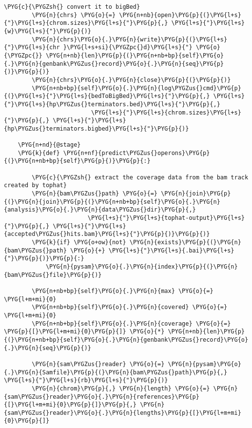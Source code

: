 \begin{Verbatim}[commandchars=\\\{\}]
        \PYG{c}{\PYGZsh{} convert it to bigBed}
        \PYG{n}{chrs} \PYG{o}{=} \PYG{n+nb}{open}\PYG{p}{(}\PYG{l+s}{"}\PYG{l+s}{chrom.sizes}\PYG{l+s}{"}\PYG{p}{,} \PYG{l+s}{"}\PYG{l+s}{w}\PYG{l+s}{"}\PYG{p}{)}
        \PYG{n}{chrs}\PYG{o}{.}\PYG{n}{write}\PYG{p}{(}\PYG{l+s}{"}\PYG{l+s}{chr }\PYG{l+s+si}{\PYGZpc{}d}\PYG{l+s}{"} \PYG{o}{\PYGZpc{}} \PYG{n+nb}{len}\PYG{p}{(}\PYG{n+nb+bp}{self}\PYG{o}{.}\PYG{n}{genbank\PYGZus{}record}\PYG{o}{.}\PYG{n}{seq}\PYG{p}{)}\PYG{p}{)}
        \PYG{n}{chrs}\PYG{o}{.}\PYG{n}{close}\PYG{p}{(}\PYG{p}{)}
        \PYG{n+nb+bp}{self}\PYG{o}{.}\PYG{n}{log\PYGZus{}cmd}\PYG{p}{(}\PYG{l+s}{"}\PYG{l+s}{bedToBigBed}\PYG{l+s}{"}\PYG{p}{,} \PYG{l+s}{"}\PYG{l+s}{hp\PYGZus{}terminators.bed}\PYG{l+s}{"}\PYG{p}{,}
                         \PYG{l+s}{"}\PYG{l+s}{chrom.sizes}\PYG{l+s}{"}\PYG{p}{,} \PYG{l+s}{"}\PYG{l+s}{hp\PYGZus{}terminators.bigbed}\PYG{l+s}{"}\PYG{p}{)}

    \PYG{n+nd}{@stage}
    \PYG{k}{def} \PYG{n+nf}{predict\PYGZus{}operons}\PYG{p}{(}\PYG{n+nb+bp}{self}\PYG{p}{)}\PYG{p}{:}

        \PYG{c}{\PYGZsh{} extract the coverage data from the bam track created by tophat}
        \PYG{n}{bam\PYGZus{}path} \PYG{o}{=} \PYG{n}{join}\PYG{p}{(}\PYG{n}{join}\PYG{p}{(}\PYG{n+nb+bp}{self}\PYG{o}{.}\PYG{n}{analysis}\PYG{o}{.}\PYG{n}{data\PYGZus{}dir}\PYG{p}{,}
                        \PYG{l+s}{"}\PYG{l+s}{tophat-output}\PYG{l+s}{"}\PYG{p}{,} \PYG{l+s}{"}\PYG{l+s}{accepted\PYGZus{}hits.bam}\PYG{l+s}{"}\PYG{p}{)}\PYG{p}{)}
        \PYG{k}{if} \PYG{o+ow}{not} \PYG{n}{exists}\PYG{p}{(}\PYG{n}{bam\PYGZus{}path} \PYG{o}{+} \PYG{l+s}{"}\PYG{l+s}{.bai}\PYG{l+s}{"}\PYG{p}{)}\PYG{p}{:}
            \PYG{n}{pysam}\PYG{o}{.}\PYG{n}{index}\PYG{p}{(}\PYG{n}{bam\PYGZus{}file}\PYG{p}{)}

        \PYG{n+nb+bp}{self}\PYG{o}{.}\PYG{n}{max} \PYG{o}{=} \PYG{l+m+mi}{0}
        \PYG{n+nb+bp}{self}\PYG{o}{.}\PYG{n}{covered} \PYG{o}{=} \PYG{l+m+mi}{0}
        \PYG{n+nb+bp}{self}\PYG{o}{.}\PYG{n}{coverage} \PYG{o}{=} \PYG{p}{[}\PYG{l+m+mi}{0}\PYG{p}{]} \PYG{o}{*} \PYG{n+nb}{len}\PYG{p}{(}\PYG{n+nb+bp}{self}\PYG{o}{.}\PYG{n}{genbank\PYGZus{}record}\PYG{o}{.}\PYG{n}{seq}\PYG{p}{)}

        \PYG{n}{sam\PYGZus{}reader} \PYG{o}{=} \PYG{n}{pysam}\PYG{o}{.}\PYG{n}{Samfile}\PYG{p}{(}\PYG{n}{bam\PYGZus{}path}\PYG{p}{,} \PYG{l+s}{"}\PYG{l+s}{rb}\PYG{l+s}{"}\PYG{p}{)}
        \PYG{n}{chrom}\PYG{p}{,} \PYG{n}{length} \PYG{o}{=} \PYG{n}{sam\PYGZus{}reader}\PYG{o}{.}\PYG{n}{references}\PYG{p}{[}\PYG{l+m+mi}{0}\PYG{p}{]}\PYG{p}{,} \PYG{n}{sam\PYGZus{}reader}\PYG{o}{.}\PYG{n}{lengths}\PYG{p}{[}\PYG{l+m+mi}{0}\PYG{p}{]}


\end{Verbatim}
